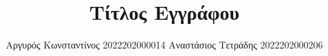 \documentclass[hidelinks, a4paper, 12pt]{report}
\title{Τίτλος Εγγράφου}
\author{Αργυρός Κωνσταντίνος 2022202000014 \newline \newline Αναστάσιος Τετράδης 2022202000206}
\begin{document}
    
    
    
    \renewcommand{\contentsname}{Περιεχόμενα}
    \renewcommand{\listfigurename}{Λίστα Σχημάτων}
    \renewcommand{\listtablename}{Λίστα Πινάκων}
    \renewcommand{\chaptername}{Κεφάλαιο}
    \renewcommand{\appendixname}{Παράρτημα}
    \renewcommand{\bibname}{Βιβλιογραφία}
    
    \setlength{\parskip}{0.5em}     %

    \tableofcontents
    
    \newpage
    
    \setlength{\parskip}{1em}       %

    
\end{document}
